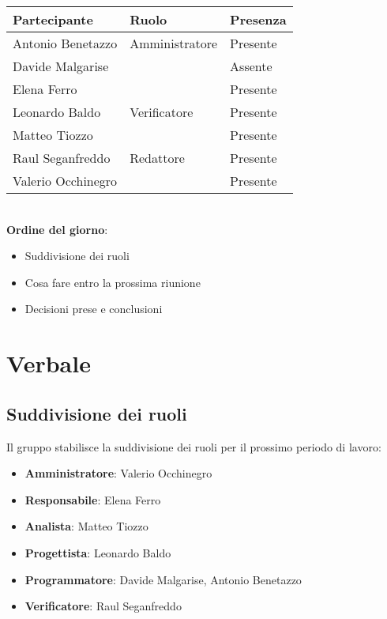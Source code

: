 \documentclass[italian,12pt]{article}
\begin{document}
\begin{flushleft}
	\begin{table}[!h]
		\begin{tabular}{ |l|l|l| }
			\hline
			\textbf{Partecipante} & \textbf{Ruolo} & \textbf{Presenza} \\
			\hline
			Antonio Benetazzo     & Amministratore & Presente          \\
			Davide Malgarise      & 		       & Assente           \\
			Elena Ferro           & 			   & Presente          \\
			Leonardo Baldo        & Verificatore   & Presente          \\
			Matteo Tiozzo         &                & Presente          \\
			Raul Seganfreddo      & Redattore	   & Presente          \\
			Valerio Occhinegro    &                & Presente          \\
			\hline
		\end{tabular}
	\end{table}
\end{flushleft}
\\
\textbf{Ordine del giorno}:
\begin{itemize}
	\item Suddivisione dei ruoli
	\item Cosa fare entro la prossima riunione
	\item Decisioni prese e conclusioni
\end{itemize}


\newpage

\section{Verbale}

\subsection{Suddivisione dei ruoli}
Il gruppo stabilisce la suddivisione dei ruoli per il prossimo periodo di lavoro:
\begin{itemize}
	\item \textbf{Amministratore}: Valerio Occhinegro
	\item \textbf{Responsabile}: Elena Ferro
	\item \textbf{Analista}: Matteo Tiozzo
	\item \textbf{Progettista}: Leonardo Baldo
	\item \textbf{Programmatore}: Davide Malgarise, Antonio Benetazzo
	\item \textbf{Verificatore}: Raul Seganfreddo
\end{itemize}
\end{document}
